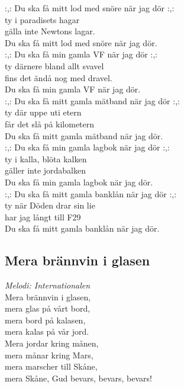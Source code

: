 \documentclass[a5paper]{article}
\begin{document}
\noindent
:,: Du ska få mitt lod med snöre när jag dör :,: \\
ty i paradisets hagar \\
gälla inte Newtons lagar.\\
Du ska få mitt lod med snöre när jag dör. \\

\noindent
:,: Du ska få min gamla VF när jag dör :,: \\
ty därnere bland allt svavel \\
fins det ändå nog med dravel. \\
Du ska få min gamla VF när jag dör. \\

\noindent
:,: Du ska få mitt gamla mätband när jag dör :,: \\
ty där uppe uti etern \\
får det slå på kilometern \\
Du ska få mitt gamla mätband när jag dör. \\

\noindent
:,: Du ska få min gamla lagbok när jag dör :,: \\
ty i kalla, blöta kalken \\
gäller inte jordabalken \\
Du ska få min gamla lagbok när jag dör. \\

\noindent
:,: Du ska få mitt gamla banklån när jag dör :,: \\
ty när Döden drar sin lie \\
har jag långt till F29 \\
Du ska få mitt gamla banklån när jag dör. \\

\newpage


\subsection{Mera brännvin i glasen}
\textit{Melodi: Internationalen} \\

\noindent
Mera brännvin i glasen, \\
mera glas på vårt bord, \\
mera bord på kalasen, \\
mera kalas på vår jord. \\
 
\noindent
Mera jordar kring månen, \\
mera månar kring Mars, \\
mera marscher till Skåne, \\
mera Skåne, Gud bevars, bevars, bevars! \\
\end{document}
